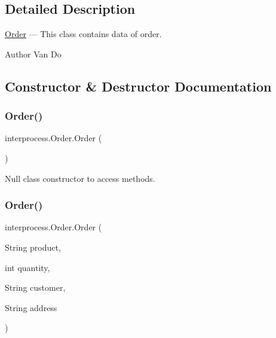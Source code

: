 \subsection{Detailed Description}
\hyperlink{classinterprocess_1_1_order}{Order} --- This class contains data of order. \begin{DoxyAuthor}{Author}
Van Do 
\end{DoxyAuthor}


\subsection{Constructor \& Destructor Documentation}
\mbox{\label{classinterprocess_1_1_order_a5e5c6892a7af1a49723b0d5c5406bdd6}} 
\subsubsection{\texorpdfstring{Order()}{Order()}\hspace{0.1cm}{\footnotesize\ttfamily [1/2]}}
{\footnotesize\ttfamily interprocess.\+Order.\+Order (\begin{DoxyParamCaption}{ }\end{DoxyParamCaption})\hspace{0.3cm}{\ttfamily [inline]}}

Null class constructor to access methods. \mbox{\label{classinterprocess_1_1_order_af13a7737eb33a202266166c9c1a59227}} 
\subsubsection{\texorpdfstring{Order()}{Order()}\hspace{0.1cm}{\footnotesize\ttfamily [2/2]}}
{\footnotesize\ttfamily interprocess.\+Order.\+Order (\begin{DoxyParamCaption}\item[{String}]{product,  }\item[{int}]{quantity,  }\item[{String}]{customer,  }\item[{String}]{address }\end{DoxyParamCaption})\hspace{0.3cm}{\ttfamily [inline]}}

